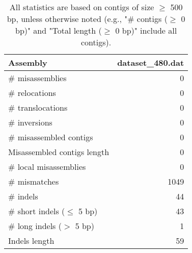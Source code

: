 \documentclass[12pt,a4paper]{article}
\begin{document}
\begin{table}[ht]
\begin{center}
\caption{All statistics are based on contigs of size $\geq$ 500 bp, unless otherwise noted (e.g., "\# contigs ($\geq$ 0 bp)" and "Total length ($\geq$ 0 bp)" include all contigs).}
\begin{tabular}{|l*{1}{|r}|}
\hline
Assembly & dataset\_480.dat \\ \hline
\# misassemblies & 0 \\ \hline
\hspace{5mm}\# relocations & 0 \\ \hline
\hspace{5mm}\# translocations & 0 \\ \hline
\hspace{5mm}\# inversions & 0 \\ \hline
\# misassembled contigs & 0 \\ \hline
Misassembled contigs length & 0 \\ \hline
\# local misassemblies & 0 \\ \hline
\# mismatches & 1049 \\ \hline
\# indels & 44 \\ \hline
\hspace{5mm}\# short indels ($\leq$ 5 bp) & 43 \\ \hline
\hspace{5mm}\# long indels ($>$ 5 bp) & 1 \\ \hline
Indels length & 59 \\ \hline
\end{tabular}
\end{center}
\end{table}
\end{document}
